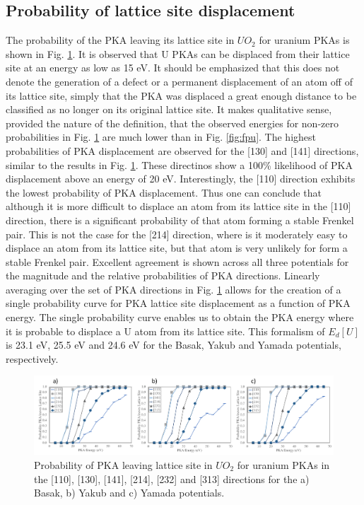 \documentclass[8pt]{article}   	%
\begin{document}
\subsection{Probability of lattice site displacement}
\hspace{5mm}
The probability of the PKA leaving its lattice site in $UO_2$ for uranium PKAs is shown in Fig. \ref{fig:latu}. It is observed that U PKAs can be displaced from their lattice site at an energy as low as 15 eV. It should be emphasized that this does not denote the generation of a defect or a permanent displacement of an atom off of its lattice site, simply that the PKA was displaced a great enough distance to be classified as no longer on its original lattice site. It makes qualitative sense, provided the nature of the definition, that the observed energies for non-zero probabilities in Fig. \ref{fig:latu} are much lower than in Fig. \ref{fig:fpu}. The highest probabilities of PKA displacement are observed for the [130] and [141] directions, similar to the results in Fig. \ref{fig:latu}. These directinos show a 100{\%} likelihood of PKA displacement above an energy of 20 eV. Interestingly, the [110] direction exhibits the lowest probability of PKA displacement. Thus one can conclude that although it is more difficult to displace an atom from its lattice site in the [110] direction, there is a significant probability of that atom forming a stable Frenkel pair. This is not the case for the [214] direction, where is it moderately easy to displace an atom from its lattice site, but that atom is very unlikely for form a stable Frenkel pair. Excellent agreement is shown across all three potentials for the magnitude and the relative probabilities of PKA directions. Linearly averaging over the set of PKA directions in Fig. \ref{fig:latu} allows for the creation of a single probability curve for PKA lattice site displacement as a function of PKA energy. The single probability curve enables us to obtain the PKA energy where it is probable to displace a U atom from its lattice site. This formalism of $E_d [U]$ is 23.1 eV, 25.5 eV and 24.6 eV for the Basak, Yakub and Yamada potentials, respectively. 
 
\begin{figure}[h]
 \centering
 \includegraphics[width=1.0\textwidth]{lat_U.png} 
 \caption{Probability of PKA leaving lattice site in $UO_2$ for uranium PKAs in the [110], [130], [141], [214], [232] and [313] directions for the a) Basak, b) Yakub and c) Yamada potentials.  }
 \label{fig:latu}
\end{figure}
\end{document}
